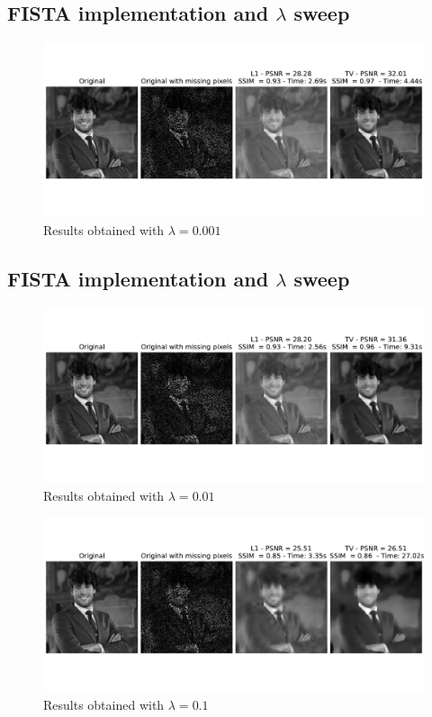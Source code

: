 \documentclass[12pt]{article}
\begin{document}
\subsection{FISTA implementation and \texorpdfstring{$\lambda$}{Lg} sweep}
\begin{figure}
    \centering
    \includegraphics[width=17cm]{hw3/codes/exercise2/results/lambda_search/me_0-001.pdf}
    \caption{Results obtained with $\lambda = 0.001$}
    \label{fig:lambda-search-0.001}
\end{figure}

\subsection{FISTA implementation and \texorpdfstring{$\lambda$}{Lg} sweep}
\begin{figure}
    \centering
    \includegraphics[width=17cm]{hw3/codes/exercise2/results/lambda_search/me_0-01.pdf}
    \caption{Results obtained with $\lambda = 0.01$}
    \label{fig:lambda-search-0.01}
\end{figure}

\begin{figure}
    \centering
    \includegraphics[width=17cm]{hw3/codes/exercise2/results/lambda_search/me_0-1.pdf}
    \caption{Results obtained with $\lambda = 0.1$}
    \label{fig:lambda-search-0.1}
\end{figure}
\end{document}
